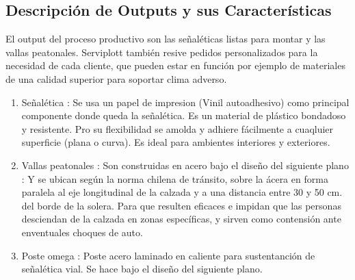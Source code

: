 	\subsection{Descripción de Outputs y sus Características}\label{output}
	El output del proceso productivo son las señaléticas listas para montar y las vallas peatonales. Serviplott también resive pedidos personalizados para la necesidad de cada cliente, que pueden estar en función por ejemplo de materiales de una calidad superior para soportar clima adverso.
	\begin{enumerate}[1)]
	\item Señalética : Se usa un papel de impresion (Vinil autoadhesivo) como principal componente donde queda la señalética. Es un material de plástico bondadoso y resistente. Pro su flexibilidad se amolda y adhiere fácilmente a cuaqluier superficie (plana o curva). Es ideal para ambientes interiores y exteriores.
	\item Vallas peatonales : Son construidas en acero bajo el diseño del siguiente plano : 
	Y se ubican según la norma chilena de tránsito, sobre la ácera en forma paralela al eje longitudinal de la calzada y a una distancia entre 30 y 50 cm. del borde de la solera. Para que resulten eficaces e impidan que las personas desciendan de la calzada en zonas específicas, y sirven como contensión ante enventuales choques de auto.
	\item Poste omega : Poste acero laminado en caliente para sustentanción de señalética vial. Se hace bajo el diseño del siguiente plano.
	\end{enumerate}
